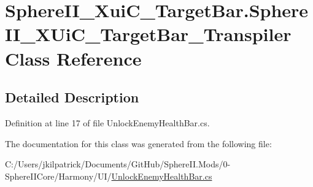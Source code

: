 \hypertarget{class_sphere_i_i___xui_c___target_bar_1_1_sphere_i_i___x_ui_c___target_bar___transpiler}{}\section{Sphere\+I\+I\+\_\+\+Xui\+C\+\_\+\+Target\+Bar.\+Sphere\+I\+I\+\_\+\+X\+Ui\+C\+\_\+\+Target\+Bar\+\_\+\+Transpiler Class Reference}
\label{class_sphere_i_i___xui_c___target_bar_1_1_sphere_i_i___x_ui_c___target_bar___transpiler}


\subsection{Detailed Description}


Definition at line 17 of file Unlock\+Enemy\+Health\+Bar.\+cs.



The documentation for this class was generated from the following file\+:\begin{DoxyCompactItemize}
\item 
C\+:/\+Users/jkilpatrick/\+Documents/\+Git\+Hub/\+Sphere\+I\+I.\+Mods/0-\/\+Sphere\+I\+I\+Core/\+Harmony/\+U\+I/\mbox{\hyperlink{_unlock_enemy_health_bar_8cs}{Unlock\+Enemy\+Health\+Bar.\+cs}}\end{DoxyCompactItemize}
